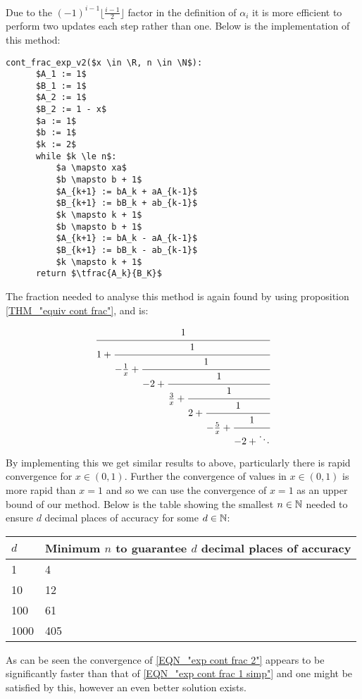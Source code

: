 Due to the \((-1)^{i-1}\lfloor\frac{i-1}{2}\rfloor\) factor in the definition of \(\alpha_i\) it is more efficient to perform two updates each step rather than one. Below is the implementation of this method:

\begin{lstlisting}[caption={Continued fraction for \(e^x\) version 2},label={PCD_"cont exp v2"}]
  cont_frac_exp_v2($x \in \R, n \in \N$):
      $A_1 := 1$
      $B_1 := 1$
      $A_2 := 1$
      $B_2 := 1 - x$
      $a := 1$
      $b := 1$
      $k := 2$
      while $k \le n$:
          $a \mapsto xa$
          $b \mapsto b + 1$
          $A_{k+1} := bA_k + aA_{k-1}$
          $B_{k+1} := bB_k + ab_{k-1}$
          $k \mapsto k + 1$
          $b \mapsto b + 1$
          $A_{k+1} := bA_k - aA_{k-1}$
          $B_{k+1} := bB_k - ab_{k-1}$
          $k \mapsto k + 1$
      return $\tfrac{A_k}{B_K}$
\end{lstlisting}

The fraction needed to analyse this method is again found by using proposition \ref{THM_"equiv cont frac"}, and is:

\begin{displaymath}
	\cfrac{1}{1 +
	\cfrac{1}{-\frac{1}{x} +
	\cfrac{1}{-2 + 
	\cfrac{1}{\frac{3}{x} +
	\cfrac{1}{2 + 
	\cfrac{1}{-\frac{5}{x} +
	\cfrac{1}{-2 + \ddots} } } } } } }
\end{displaymath}

By implementing this we get similar results to above, particularly there is rapid convergence for \(x \in (0, 1)\). Further the convergence of values in \(x \in (0,1)\) is more rapid than \(x = 1\) and so we can use the convergence of \(x = 1\) as an upper bound of our method. Below is the table showing the smallest \(n \in \mathbb{N}\) needed to ensure \(d\) decimal places of accuracy for some \(d \in \mathbb{N}\):

\begin{center}
\begin{tabular}{|l|l|}
\hline
\(d\) & Minimum \(n\) to guarantee \(d\) decimal places of accuracy\\\hline
1 & 4 \\\hline
10 & 12 \\\hline
100 & 61 \\\hline
1000 & 405 \\\hline
\end{tabular}
\end{center}

As can be seen the convergence of \ref{EQN_"exp cont frac 2"} appears to be significantly faster than that of \ref{EQN_"exp cont frac 1 simp"} and one might be satisfied by this, however an even better solution exists.\\

